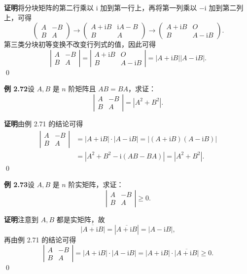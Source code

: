\documentclass[UTF8, 12pt, fontset=fandol, oneside]{ctexart}
\begin{document}
\noindent\textbf{证明}\quad 将分块矩阵的第二行乘以 $\mathrm i$ 加到第一行上，再将第一列乘以 $-\mathrm i$ 加到第二列上，可得
\[
\left(
\begin{array}{cc}
A & -B\\
B & A
\end{array}
\right)
\to
\left(
\begin{array}{cc}
A+\mathrm iB & \mathrm iA-B\\
B & A
\end{array}
\right)
\to
\left(
\begin{array}{cc}
A+\mathrm iB & O\\
B & A-\mathrm iB
\end{array}
\right).
\]
第三类分块初等变换不改变行列式的值，因此可得
\[
\left|
\begin{array}{cc}
A & -B\\
B & A
\end{array}
\right|
=
\left|
\begin{array}{cc}
A+\mathrm iB & O\\
B & A-\mathrm iB
\end{array}
\right|
=|A+\mathrm iB||A-\mathrm iB|.
\]
\qed

\noindent\textbf{例 2.72}\quad 设 $A,B$ 是 $n$ 阶矩阵且 $AB=BA$，求证：
\[
\left|
\begin{array}{cc}
A & -B\\
B & A
\end{array}
\right|
=|A^2+B^2|.
\]

\noindent\textbf{证明}\quad 由例 2.71 的结论可得
\[
\begin{aligned}
\left|
\begin{array}{cc}
A & -B\\
B & A
\end{array}
\right|
&=|A+\mathrm iB|\cdot|A-\mathrm iB|
=|(A+\mathrm iB)(A-\mathrm iB)|\\
&=|A^2+B^2-\mathrm i(AB-BA)|=|A^2+B^2|.
\end{aligned}
\]
\qed

\noindent\textbf{例 2.73}\quad 设 $A,B$ 是 $n$ 阶实矩阵，求证：
\[
\left|
\begin{array}{cc}
A & -B\\
B & A
\end{array}
\right|\ge0.
\]

\noindent\textbf{证明}\quad 注意到 $A,B$ 都是实矩阵，故
\[
\overline{|A+\mathrm iB|}=|\overline{A+\mathrm iB}|=|A-\mathrm iB|,
\]
再由例 2.71 的结论可得
\[
\left|
\begin{array}{cc}
A & -B\\
B & A
\end{array}
\right|
=|A+\mathrm iB|\cdot|A-\mathrm iB|
=|A+\mathrm iB|\cdot\overline{|A+\mathrm iB|}\ge0.
\]
\qed
\end{document}
